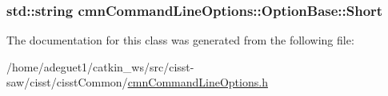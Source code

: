 \hypertarget{classcmn_command_line_options_1_1_option_base_aa7799a5119c4018ddb5e10eebbde2d16}{
\subsubsection[{Short}]{\setlength{\rightskip}{0pt plus 5cm}std\-::string cmn\-Command\-Line\-Options\-::\-Option\-Base\-::\-Short}}\label{classcmn_command_line_options_1_1_option_base_aa7799a5119c4018ddb5e10eebbde2d16}


The documentation for this class was generated from the following file\-:\begin{DoxyCompactItemize}
\item 
/home/adeguet1/catkin\-\_\-ws/src/cisst-\/saw/cisst/cisst\-Common/\hyperlink{cmn_command_line_options_8h}{cmn\-Command\-Line\-Options.\-h}\end{DoxyCompactItemize}

